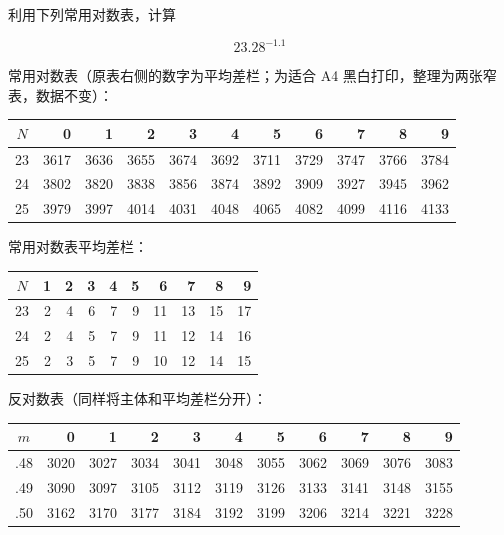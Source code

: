 \begin{question}
利用下列常用对数表，计算

\nopagebreak[4]
\[
23.28^{-1.1}
\]

常用对数表（原表右侧的数字为平均差栏；为适合 A4 黑白打印，整理为两张窄表，数据不变）：

\scriptsize

\begin{center}
\begingroup\setlength{\tabcolsep}{4pt}
\begin{tabular}{crrrrrrrrrr}
\toprule
$N$ & 0 & 1 & 2 & 3 & 4 & 5 & 6 & 7 & 8 & 9 \\
\midrule
23 & 3617 & 3636 & 3655 & 3674 & 3692 & 3711 & 3729 & 3747 & 3766 & 3784 \\
24 & 3802 & 3820 & 3838 & 3856 & 3874 & 3892 & 3909 & 3927 & 3945 & 3962 \\
25 & 3979 & 3997 & 4014 & 4031 & 4048 & 4065 & 4082 & 4099 & 4116 & 4133 \\
\bottomrule
\end{tabular}
\endgroup
\end{center}

\normalsize

常用对数表平均差栏：

\scriptsize

\begin{center}
\begingroup\setlength{\tabcolsep}{4pt}
\begin{tabular}{crrrrrrrrr}
\toprule
$N$ & 1 & 2 & 3 & 4 & 5 & 6 & 7 & 8 & 9 \\
\midrule
23 & 2 & 4 & 6 & 7 & 9 & 11 & 13 & 15 & 17 \\
24 & 2 & 4 & 5 & 7 & 9 & 11 & 12 & 14 & 16 \\
25 & 2 & 3 & 5 & 7 & 9 & 10 & 12 & 14 & 15 \\
\bottomrule
\end{tabular}
\endgroup
\end{center}

\normalsize

反对数表（同样将主体和平均差栏分开）：

\scriptsize

\begin{center}
\begingroup\setlength{\tabcolsep}{4pt}
\begin{tabular}{crrrrrrrrrr}
\toprule
$m$ & 0 & 1 & 2 & 3 & 4 & 5 & 6 & 7 & 8 & 9 \\
\midrule
.48 & 3020 & 3027 & 3034 & 3041 & 3048 & 3055 & 3062 & 3069 & 3076 & 3083 \\
.49 & 3090 & 3097 & 3105 & 3112 & 3119 & 3126 & 3133 & 3141 & 3148 & 3155 \\
.50 & 3162 & 3170 & 3177 & 3184 & 3192 & 3199 & 3206 & 3214 & 3221 & 3228 \\
\bottomrule
\end{tabular}
\endgroup
\end{center}


\end{question}
